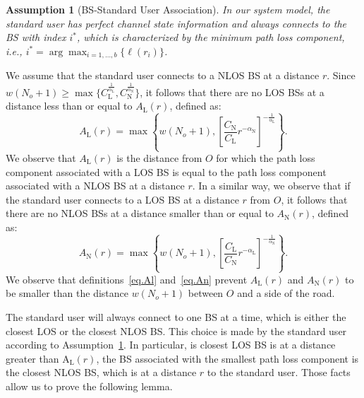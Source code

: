 \documentclass[10pt,journal,a4paper]{IEEEtran}
\newtheorem{assumption}{Assumption}[section]
\begin{document}
\begin{assumption}[BS-Standard User Association]\label{ass.BSTUass}
In our system model, the standard user has perfect channel state information and always connects to the BS with index $i^*$, which is characterized by the minimum path loss component, i.e., $i^* = \displaystyle\arg\max_{i = 1, \ldots, b}\{\ell(r_i)\}$.
\end{assumption}

We assume that the standard user connects to a NLOS BS at a distance $r$. Since $w(N_o + 1) \geq \max\{C_\mathrm{L}^{\frac{1}{\alpha_\mathrm{L}}},C_\mathrm{N}^{\frac{1}{\alpha_\mathrm{N}}}\}$, it follows that there are no LOS BSs at a distance less than or equal to $A_{\mathrm{L}}(r)$, defined as:
\begin{equation}
A_{\mathrm{L}}(r) = \max\left\{w(N_o + 1),\left[\frac{C_{\mathrm{N}}}{C_{\mathrm{L}}} r^{-\alpha_{\mathrm{N}}}\right]^{-\frac{1}{\alpha_{\mathrm{L}}}}\right\}. \label{eq.Al}
\end{equation}
We observe that $A_{\mathrm{L}}(r)$ is the distance from $O$ for which the path loss component associated with a LOS BS is equal to the path loss component associated with a NLOS BS at a distance $r$. In a similar way, we observe that if the standard user connects to a LOS BS at a distance $r$ from $O$, it follows that there are no NLOS BSs at a distance smaller than or equal to $A_{\mathrm{N}}(r)$, defined as:
\begin{equation}
A_{\mathrm{N}}(r) = \max\left\{w(N_o + 1),\left[\frac{C_{\mathrm{L}}}{C_{\mathrm{N}}} r^{-\alpha_{\mathrm{L}}}\right]^{-\frac{1}{\alpha_{\mathrm{N}}}}\right\}. \label{eq.An}
\end{equation}
We observe that definitions~\eqref{eq.Al} and~\eqref{eq.An} prevent $A_{\mathrm{L}}(r)$ and $A_{\mathrm{N}}(r)$ to be smaller than the distance $w(N_o+1)$ between $O$ and a side of the road.

The standard user will always connect to one BS at a time, which is either the closest LOS or the closest NLOS BS. This choice is made by the standard user according to Assumption~\ref{ass.BSTUass}. In particular, is closest LOS BS is at a distance greater than $\mathrm{A_{L}}(r)$, the BS associated with the smallest path loss component is the closest NLOS BS, which is at a distance $r$ to the standard user. Those facts allow us to prove the following lemma.
\end{document}
